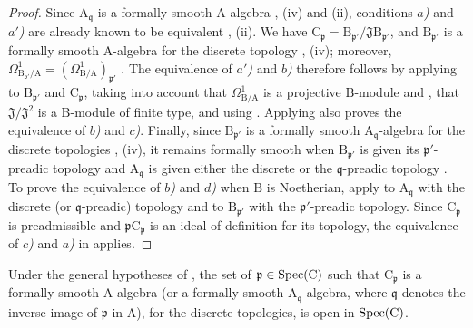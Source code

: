 \begin{proof}
Since $\mathrm{A}_{\mathfrak{q}}$ is a formally smooth
$\mathrm{A}$-algebra , (iv) and (ii), conditions \emph{$a$)} and
\emph{$a'$)} are already known to be equivalent , (ii). We have
$\mathrm{C}_\mathfrak{p}=\mathrm{B}_{\mathfrak{p}'}/
\mathfrak{J}\mathrm{B}_{\mathfrak{p}'}$, and
$\mathrm{B}_{\mathfrak{p}'}$ is a formally smooth $\mathrm{A}$-algebra for
the discrete topology , (iv); moreover,
$\Omega^1_{\mathrm{B}_{\mathfrak{p}'}/\mathrm{A}}
=(\Omega^1_{\mathrm{B}/\mathrm{A}})_{\mathfrak{p}'}$ .
The equivalence of \emph{$a'$)} and \emph{$b$)} therefore follows by applying
 to $\mathrm{B}_{\mathfrak{p}'}$ and
$\mathrm{C}_\mathfrak{p}$, taking into account that
$\Omega^1_{\mathrm{B}/\mathrm{A}}$ is a projective $\mathrm{B}$-module
 and , that
$\mathfrak{J}/\mathfrak{J}^2$ is a $\mathrm{B}$-module of finite type, and
using . Applying  also proves the equivalence
of \emph{$b$)} and \emph{$c$)}. Finally, since $\mathrm{B}_{\mathfrak{p}'}$ is a formally
smooth $\mathrm{A}_{\mathfrak{q}}$-algebra for the
discrete topologies , (iv), it remains formally smooth when
$\mathrm{B}_{\mathfrak{p}'}$ is given its $\mathfrak{p}'$-preadic topology
and $\mathrm{A}_{\mathfrak{q}}$ is given either the discrete or the
$\mathfrak{q}$-preadic topology . To prove the equivalence of
\emph{$b$)} and \emph{$d$)} when $\mathrm{B}$ is Noetherian, apply  to
$\mathrm{A}_{\mathfrak{q}}$ with the discrete (or $\mathfrak{q}$-preadic)
topology and to $\mathrm{B}_{\mathfrak{p}'}$ with the
$\mathfrak{p}'$-preadic topology. Since $\mathrm{C}_\mathfrak{p}$ is
preadmissible and $\mathfrak{p}\mathrm{C}_\mathfrak{p}$ is an ideal of
definition for its topology, the equivalence of \emph{$c$)} and \emph{$a$)} in
 applies.
\end{proof}

\begin{corollary}[22.6.5]
\label{0.22.6.5}
Under the general hypotheses of , the set of
$\mathfrak{p}\in\operatorname{Spec}(\mathrm{C})$ such that $\mathrm{C}_\mathfrak{p}$ is a
formally smooth $\mathrm{A}$-algebra \textup{(or a formally smooth
$\mathrm{A}_{\mathfrak{q}}$-algebra, where $\mathfrak{q}$ denotes the inverse
image of $\mathfrak{p}$ in $\mathrm{A}$)}, for the discrete topologies, is open
in $\operatorname{Spec}(\mathrm{C})$.
\end{corollary}

